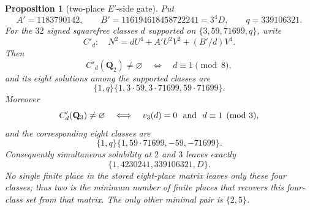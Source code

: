 \documentclass[11pt]{article}
\newtheorem{proposition}[theorem]{Proposition}
\begin{document}
\begin{proposition}[two-place $E'$-side gate]\label{prop:eprime-two-place-gate}
Put
\[
 A'=1183790142,\qquad B'=116194618458722241=3^4D,
 \qquad q=339106321.
\]
For the $32$ signed squarefree classes $d$ supported on
$\{3,59,71699,q\}$, write
\[
 C'_d:\quad N^2=dU^4+A'U^2V^2+(B'/d)V^4.
\]
Then
\[
 C'_d(\mathbf Q_2)\ne\varnothing
 \quad\Longleftrightarrow\quad d\equiv1\pmod8,
\]
and its eight solutions among the supported classes are
\[
 \{1,q\}\{1,3\cdot59,3\cdot71699,59\cdot71699\}.
\]
Moreover
\[
 C'_d(\mathbf Q_3)\ne\varnothing
 \quad\Longleftrightarrow\quad v_3(d)=0\ \hbox{ and }\ d\equiv1\pmod3,
\]
and the corresponding eight classes are
\[
 \{1,q\}\{1,59\cdot71699,-59,-71699\}.
\]
Consequently simultaneous solubility at $2$ and $3$ leaves exactly
\[
 \{1,4230241,339106321,D\}.
\]
No single finite place in the stored eight-place matrix leaves only these
four classes; thus two is the minimum number of finite places that recovers
this four-class set from that matrix.  The only other minimal pair is
$\{2,5\}$.
\end{proposition}
\end{document}

